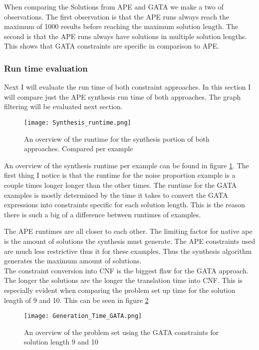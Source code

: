\documentclass{article}
\begin{document}
When comparing the Solutions from APE and GATA we make a two of observations. The first observation is that the APE runs always reach the maximum of 1000 results before reaching the maximum solution length. The second is that the APE runs always have solutions in multiple solution lengths. This shows that GATA constraints are specific in comparison to APE.

\subsubsection{Run time evaluation}
Next I will evaluate the run time of both constraint approaches. In this section I will compare just the APE synthesis run time of both approaches. The graph filtering will be evaluated next section. 

\begin{figure}[H]
  \centering
    \texttt{[image: Synthesis\_runtime.png]}
    \caption{An overview of the runtime for the synthesis portion of both approaches. Compared per example}
    \label{figure:synthesisRuntime}
\end{figure}

An overview of the synthesis runtime per example can be found in figure \ref{figure:synthesisRuntime}. The first thing I notice is that the runtime for the noise proportion example is a couple times longer longer than the other times. The runtime for the GATA examples is mostly determined by the time it takes to convert the GATA expressions into constraints specific for each solution length. This is the reason there is such a big of a difference between runtimes of examples. 

The APE runtimes are all closer to each other. The limiting factor for native ape is the amount of solutions the synthesis must generate. The APE constraints used are much less restrictive thus it for these examples. Thus the synthesis algorithm generates the maximum amount of solutions. \\

The constraint conversion into CNF is the biggest flaw for the GATA approach. The longer the solutions are the longer the translation time into CNF. This is especially evident when comparing the problem set up time for the solution length of 9 and 10. This can be seen in figure \ref{figure:problemsetup}

\begin{figure}[H]
  \centering
    \texttt{[image: Generation\_Time\_GATA.png]}
    \caption{An overview of the problem set using the GATA constraints for solution length 9 and 10}
    \label{figure:problemsetup}
\end{figure}
\end{document}
